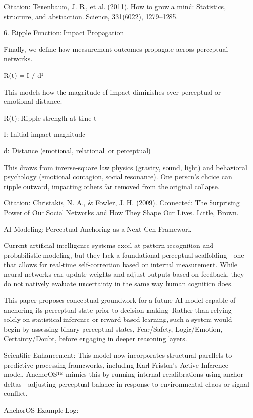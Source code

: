 \documentclass[11pt]{article}
\begin{document}
Citation: Tenenbaum, J. B., et al. (2011). How to grow a mind: Statistics, structure, and abstraction. Science, 331(6022), 1279–1285.

6. Ripple Function: Impact Propagation

Finally, we define how measurement outcomes propagate across perceptual networks.

R(t) = I / d²

This models how the magnitude of impact diminishes over perceptual or emotional distance.

R(t): Ripple strength at time t

I: Initial impact magnitude

d: Distance (emotional, relational, or perceptual)

This draws from inverse-square law physics (gravity, sound, light) and behavioral psychology (emotional contagion, social resonance). One person’s choice can ripple outward, impacting others far removed from the original collapse.

Citation: Christakis, N. A., & Fowler, J. H. (2009). Connected: The Surprising Power of Our Social Networks and How They Shape Our Lives. Little, Brown.

AI Modeling: Perceptual Anchoring as a Next-Gen Framework

Current artificial intelligence systems excel at pattern recognition and probabilistic modeling, but they lack a foundational perceptual scaffolding—one that allows for real-time self-correction based on internal measurement. While neural networks can update weights and adjust outputs based on feedback, they do not natively evaluate uncertainty in the same way human cognition does.

This paper proposes conceptual groundwork for a future AI model capable of anchoring its perceptual state prior to decision-making. Rather than relying solely on statistical inference or reward-based learning, such a system would begin by assessing binary perceptual states, Fear/Safety, Logic/Emotion, Certainty/Doubt, before engaging in deeper reasoning layers.

Scientific Enhancement: This model now incorporates structural parallels to predictive processing frameworks, including Karl Friston’s Active Inference model. AnchorOS™ mimics this by running internal recalibrations using anchor deltas—adjusting perceptual balance in response to environmental chaos or signal conflict.

AnchorOS Example Log:
\end{document}
